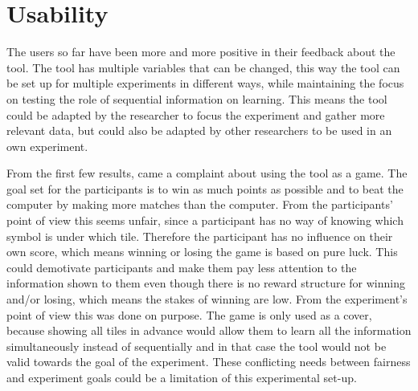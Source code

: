 \documentclass[twoside]{uva-inf-bachelor-thesis}
\theoremstyle{definition}
\begin{document}
\section{Usability}
The users so far have been more and more positive in their feedback about the tool. The tool has multiple variables that can be changed, this way the tool can be set up for multiple experiments in different ways, while maintaining the focus on testing the role of sequential information on learning. This means the tool could be adapted by the researcher to focus the experiment and gather more relevant data, but could also be adapted by other researchers to be used in an own experiment. 

From the first few results, came a complaint about using the tool as a game. The goal set for the participants is to win as much points as possible and to beat the computer by making more matches than the computer. From the participants' point of view this seems unfair, since a participant has no way of knowing which symbol is under which tile. Therefore the participant has no influence on their own score, which means winning or losing the game is based on pure luck. This could demotivate participants and make them pay less attention to the information shown to them even though there is no reward structure for winning and/or losing, which means the stakes of winning are low. From the experiment's point of view this was done on purpose. The game is only used as a cover, because showing all tiles in advance would allow them to learn all the information simultaneously instead of sequentially and in that case the tool would not be valid towards the goal of the experiment. These conflicting needs between fairness and experiment goals could be a limitation of this experimental set-up.
\end{document}
